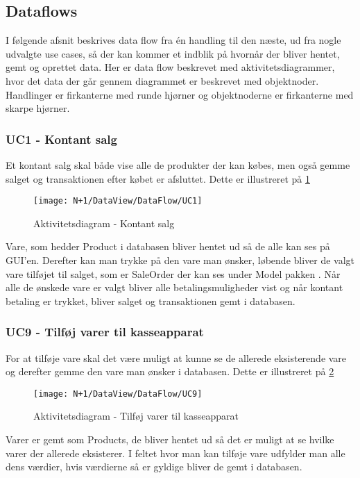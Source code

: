 \subsection{Dataflows}
I følgende afsnit beskrives data flow fra én handling til den næste, ud fra nogle udvalgte use cases, så der kan kommer et indblik på hvornår der bliver hentet, gemt og oprettet data. Her er data flow beskrevet med aktivitetsdiagrammer, hvor det data der går gennem diagrammet er beskrevet med objektnoder. Handlinger er firkanterne med runde hjørner og objektnoderne er firkanterne med skarpe hjørner.   

\subsubsection{UC1 - Kontant salg}
Et kontant salg skal både vise alle de produkter der kan købes, men også gemme salget og transaktionen efter købet er afsluttet. Dette er illustreret på \ref{fig:AD_UC1}

\begin{figure}[H]
    \centering
    \texttt{[image: N+1/DataView/DataFlow/UC1]}
    \caption{Aktivitetsdiagram - Kontant salg}
    \label{fig:AD_UC1}
\end{figure}    

Vare, som hedder Product i databasen bliver hentet ud så de alle kan ses på GUI'en. Derefter kan man trykke på den vare man ønsker, løbende bliver de valgt vare tilføjet til salget, som er SaleOrder der kan ses under Model pakken . Når alle de ønskede vare er valgt bliver alle betalingsmuligheder vist og når kontant betaling er trykket, bliver salget og transaktionen gemt i databasen. 

\subsubsection{UC9 - Tilføj varer til kasseapparat}
For at tilføje vare skal det være muligt at kunne se de allerede eksisterende vare og derefter gemme den vare man ønsker i databasen. Dette er illustreret på \ref{fig:AD_UC9}

\begin{figure}[H]
    \centering
    \texttt{[image: N+1/DataView/DataFlow/UC9]}
    \caption{Aktivitetsdiagram - Tilføj varer til kasseapparat}
    \label{fig:AD_UC9}
\end{figure}    

Varer er gemt som Products, de bliver hentet ud så det er muligt at se hvilke varer der allerede eksisterer. I feltet hvor man kan tilføje vare udfylder man alle dens værdier, hvis værdierne så er gyldige bliver de gemt i databasen. 


